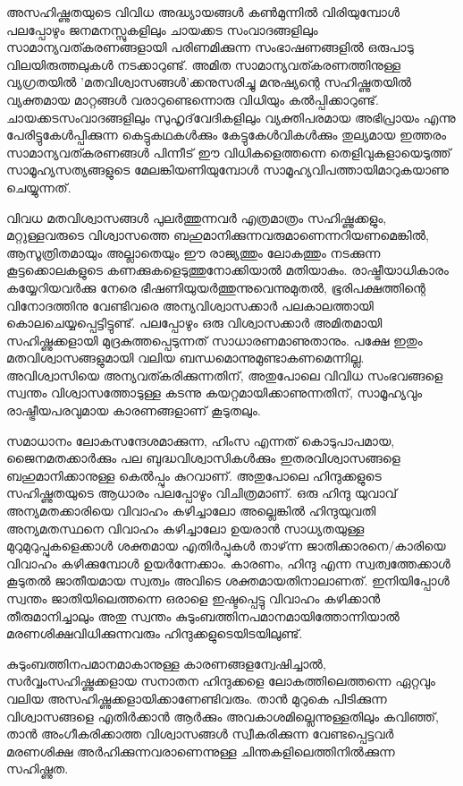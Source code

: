 
\vskip 2pt

അസഹിഷ്ണുതയുടെ വിവിധ അദ്ധ്യായങ്ങള്‍ കണ്‍മുന്നില്‍ വിരിയുമ്പോള്‍ പലപ്പോഴും ജനമനസ്സുകളിലും ചായക്കട സംവാദങ്ങളിലും 
സാമാന്യവത്കരണങ്ങളായി പരിണമിക്കുന്ന സംഭാഷണങ്ങളില്‍ ഒരുപാടു വിലയിരുത്തലുകള്‍ നടക്കാറുണ്ട്. അമിത സാമാന്യവത്കരണത്തിനുള്ള
 വ്യഗ്രതയില്‍ 'മതവിശ്വാസങ്ങള്‍'ക്കനുസരിച്ചു മനുഷ്യന്റെ സഹിഷ്ണുതയില്‍ വ്യക്തമായ മാറ്റങ്ങള്‍ വരാറുണ്ടെന്നൊരു വിധിയും കല്‍പ്പിക്കാറുണ്ട്. 
 ചായക്കടസംവാദങ്ങളിലും സുഹൃദ്‌വേദികളിലും വ്യക്തിപരമായ അഭിപ്രായം എന്നു പേരിട്ടുകേള്‍പ്പിക്കുന്ന കെട്ടുകഥകള്‍ക്കും കേട്ടുകേള്‍വികള്‍ക്കും
  തുല്യമായ ഇത്തരം സാമാന്യവത്കരണങ്ങള്‍ പിന്നീട് ഈ വിധികളെത്തന്നെ തെളിവുകളായെടുത്ത് സാമൂഹ്യസത്യങ്ങളുടെ 
  മേലങ്കിയണിയുമ്പോള്‍ സാമൂഹ്യവിപത്തായിമാറുകയാണു ചെയ്യുന്നത്.

വിവധ മതവിശ്വാസങ്ങള്‍ പുലര്‍ത്തുന്നവര്‍ എത്രമാത്രം സഹിഷ്ണുക്കളും, മറ്റുള്ളവരുടെ വിശ്വാസത്തെ ബഹുമാനിക്കുന്നവരുമാണെന്നറിയണമെങ്കില്‍, 
ആസൂത്രിതമായും അല്ലാതെയും ഈ രാജ്യത്തും ലോകത്തും നടക്കുന്ന കൂട്ടക്കൊലകളുടെ കണക്കുകളെടുത്തുനോക്കിയാല്‍ മതിയാകും. 
രാഷ്ട്രീയാധികാരം കയ്യേറിയവര്‍ക്കു നേരെ ഭീഷണിയുയര്‍ത്തുന്നുവെന്നുമുതല്‍, ഭൂരിപക്ഷത്തിന്റെ വിനോദത്തിനു വേണ്ടിവരെ അന്യവിശ്വാസക്കാര്‍ 
പലകാലത്തായി കൊലചെയ്യപ്പെട്ടിട്ടുണ്ട്. പലപ്പോഴും ഒരു വിശ്വാസക്കാര്‍ അമിതമായി സഹിഷ്ണുക്കളായി മുദ്രകുത്തപ്പെടുന്നത് സാധാരണമാണുതാനും. 
പക്ഷേ ഇതും മതവിശ്വാസങ്ങളുമായി വലിയ ബന്ധമൊന്നുമുണ്ടാകണമെന്നില്ല. അവിശ്വാസിയെ അന്യവത്കരിക്കുന്നതിന്, അതുപോലെ 
വിവിധ സംഭവങ്ങളെ സ്വന്തം വിശ്വാസത്തോടുള്ള കടന്നു കയറ്റമായിക്കാണുന്നതിന്, സാമൂഹ്യവും രാഷ്ട്രീയപരവുമായ കാരണങ്ങളാണ് കൂടുതലും.

സമാധാനം ലോകസന്ദേശമാക്കുന്ന, ഹിംസ എന്നത് കൊടുപാപമായ, ജൈനമതക്കാര്‍ക്കും പല ബുദ്ധവിശ്വാസികള്‍ക്കും 
ഇതരവിശ്വാസങ്ങളെ ബഹുമാനിക്കാനുള്ള കെല്‍പ്പും കുറവാണ്. അതുപോലെ ഹിന്ദുക്കളുടെ സഹിഷ്ണുതയുടെ ആധാരം പലപ്പോഴും 
വിചിത്രമാണ്. ഒരു ഹിന്ദു യുവാവ് അന്യമതക്കാരിയെ വിവാഹം കഴിച്ചാലോ അല്ലെങ്കില്‍ ഹിന്ദുയുവതി അന്യമതസ്ഥനെ വിവാഹം 
കഴിച്ചാലോ ഉയരാന്‍ സാധ്യതയുള്ള മുറുമുറുപ്പുകളെക്കാള്‍ ശക്തമായ എതിര്‍പ്പുകള്‍ താഴ്‌ന്ന ജാതിക്കാരനെ/കാരിയെ വിവാഹം 
കഴിക്കുമ്പോള്‍ ഉയര്‍ന്നേക്കാം. കാരണം, ഹിന്ദു എന്ന സ്വത്വത്തേക്കാള്‍ കൂടുതല്‍ ജാതീയമായ സ്വത്വം അവിടെ ശക്തമായതിനാലാണത്. 
ഇനിയിപ്പോള്‍ സ്വന്തം ജാതിയിലെത്തന്നെ ഒരാളെ ഇഷ്ടപ്പെട്ടു വിവാഹം കഴിക്കാന്‍ തീരുമാനിച്ചാലും അതു സ്വന്തം 
കുടുംബത്തിനപമാനമായിത്തോന്നിയാല്‍ മരണശിക്ഷവിധിക്കുന്നവരും ഹിന്ദുക്കളുടെയിടയിലുണ്ട്.

കുടുംബത്തിനപമാനമാകാനുള്ള കാരണങ്ങളന്വേഷിച്ചാല്‍, സര്‍വ്വംസഹിഷ്ണുക്കളായ സനാതന ഹിന്ദുക്കളെ ലോകത്തിലെത്തന്നെ
 ഏറ്റവും വലിയ അസഹിഷ്ണുക്കളായിക്കാണേണ്ടിവരും. താന്‍ മുറുകെ പിടിക്കുന്ന വിശ്വാസങ്ങളെ എതിര്‍ക്കാന്‍ ആര്‍ക്കും അവകാശമില്ലെന്നുള്ളതിലും 
 കവിഞ്ഞ്, താന്‍ അംഗീകരിക്കാത്ത വിശ്വാസങ്ങള്‍ സ്വീകരിക്കുന്ന വേണ്ടപ്പെട്ടവര്‍ മരണശിക്ഷ അര്‍ഹിക്കുന്നവരാണെന്നുള്ള 
 ചിന്തകളിലെത്തിനില്‍ക്കുന്ന സഹിഷ്ണുത.

